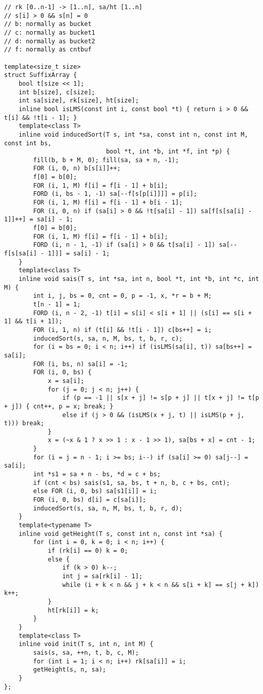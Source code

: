 \documentclass[]{article}
\begin{document}
\begin{verbatim}
// rk [0..n-1] -> [1..n], sa/ht [1..n]
// s[i] > 0 && s[n] = 0
// b: normally as bucket
// c: normally as bucket1
// d: normally as bucket2
// f: normally as cntbuf

template<size_t size>
struct SuffixArray {
    bool t[size << 1];
    int b[size], c[size];
    int sa[size], rk[size], ht[size];
    inline bool isLMS(const int i, const bool *t) { return i > 0 && t[i] && !t[i - 1]; }
    template<class T>
    inline void inducedSort(T s, int *sa, const int n, const int M, const int bs,
                            bool *t, int *b, int *f, int *p) {
        fill(b, b + M, 0); fill(sa, sa + n, -1);
        FOR (i, 0, n) b[s[i]]++;
        f[0] = b[0];
        FOR (i, 1, M) f[i] = f[i - 1] + b[i];
        FORD (i, bs - 1, -1) sa[--f[s[p[i]]]] = p[i];
        FOR (i, 1, M) f[i] = f[i - 1] + b[i - 1];
        FOR (i, 0, n) if (sa[i] > 0 && !t[sa[i] - 1]) sa[f[s[sa[i] - 1]]++] = sa[i] - 1;
        f[0] = b[0];
        FOR (i, 1, M) f[i] = f[i - 1] + b[i];
        FORD (i, n - 1, -1) if (sa[i] > 0 && t[sa[i] - 1]) sa[--f[s[sa[i] - 1]]] = sa[i] - 1;
    }
    template<class T>
    inline void sais(T s, int *sa, int n, bool *t, int *b, int *c, int M) {
        int i, j, bs = 0, cnt = 0, p = -1, x, *r = b + M;
        t[n - 1] = 1;
        FORD (i, n - 2, -1) t[i] = s[i] < s[i + 1] || (s[i] == s[i + 1] && t[i + 1]);
        FOR (i, 1, n) if (t[i] && !t[i - 1]) c[bs++] = i;
        inducedSort(s, sa, n, M, bs, t, b, r, c);
        for (i = bs = 0; i < n; i++) if (isLMS(sa[i], t)) sa[bs++] = sa[i];
        FOR (i, bs, n) sa[i] = -1;
        FOR (i, 0, bs) {
            x = sa[i];
            for (j = 0; j < n; j++) {
                if (p == -1 || s[x + j] != s[p + j] || t[x + j] != t[p + j]) { cnt++, p = x; break; }
                else if (j > 0 && (isLMS(x + j, t) || isLMS(p + j, t))) break;
            }
            x = (~x & 1 ? x >> 1 : x - 1 >> 1), sa[bs + x] = cnt - 1;
        }
        for (i = j = n - 1; i >= bs; i--) if (sa[i] >= 0) sa[j--] = sa[i];
        int *s1 = sa + n - bs, *d = c + bs;
        if (cnt < bs) sais(s1, sa, bs, t + n, b, c + bs, cnt);
        else FOR (i, 0, bs) sa[s1[i]] = i;
        FOR (i, 0, bs) d[i] = c[sa[i]];
        inducedSort(s, sa, n, M, bs, t, b, r, d);
    }
    template<typename T>
    inline void getHeight(T s, const int n, const int *sa) {
        for (int i = 0, k = 0; i < n; i++) {
            if (rk[i] == 0) k = 0;
            else {
                if (k > 0) k--;
                int j = sa[rk[i] - 1];
                while (i + k < n && j + k < n && s[i + k] == s[j + k]) k++;
            }
            ht[rk[i]] = k;
        }
    }
    template<class T>
    inline void init(T s, int n, int M) {
        sais(s, sa, ++n, t, b, c, M);
        for (int i = 1; i < n; i++) rk[sa[i]] = i;
        getHeight(s, n, sa);
    }
};


\end{verbatim}
\end{document}
